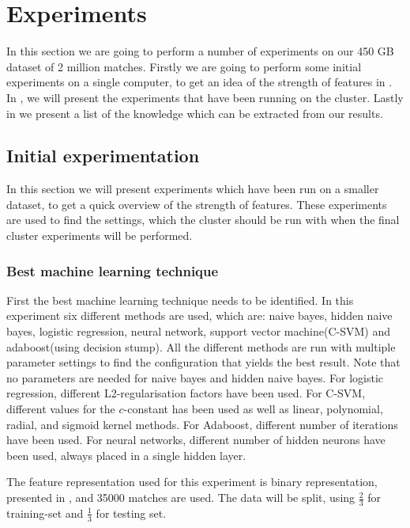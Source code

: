 \section{Experiments}\label{sec:testing}
In this section we are going to perform a number of experiments on our 450 GB dataset of 2 million matches. Firstly we are going to perform some initial experiments on a single computer, to get an idea of the strength of features in . In , we will present the experiments that have been running on the cluster. Lastly in  we present a list of the knowledge which can be extracted from our results.

\subsection{Initial experimentation}\label{sec:initialtest}
In this section we will present experiments which have been run on a smaller dataset, to get a quick overview of the strength of features. These experiments are used to find the settings, which the cluster should be run with when the final cluster experiments will be performed.

\subsubsection{Best machine learning technique}
First the best machine learning technique needs to be identified. In this experiment six different methods are used, which are: naive bayes, hidden naive bayes, logistic regression, neural network, support vector machine(C-SVM) and adaboost(using decision stump). All the different methods are run with multiple parameter settings to find the configuration that yields the best result. Note that no parameters are needed for naive bayes and hidden naive bayes. For logistic regression, different L2-regularisation factors have been used. For C-SVM, different values for the $c$-constant has been used as well as linear, polynomial, radial, and sigmoid kernel methods. For Adaboost, different number of iterations have been used. For neural networks, different number of hidden neurons have been used, always placed in a single hidden layer.

The feature representation used for this experiment is binary representation, presented in , and 35000 matches are used. The data will be split, using $\frac{2}{3}$ for training-set and $\frac{1}{3}$ for testing set. 


